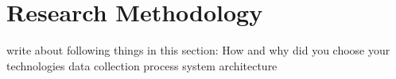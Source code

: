 \chapter{Research Methodology}

write about following things in this section:
How and why did you choose your technologies
data collection process
system architecture


